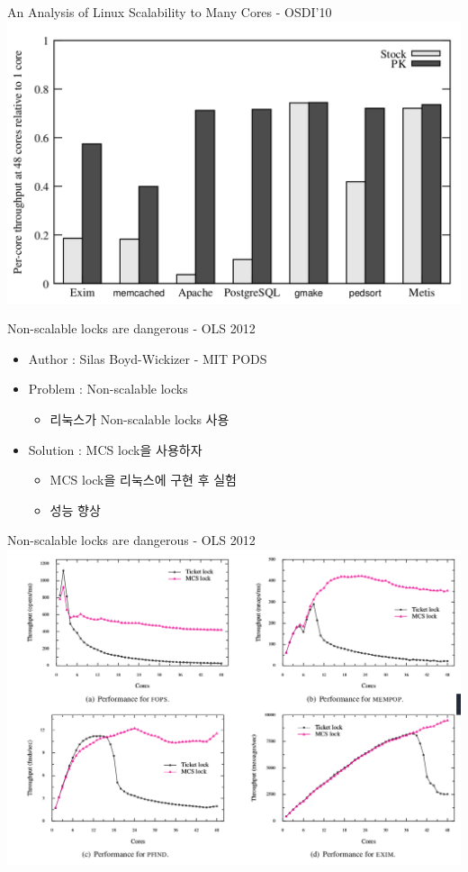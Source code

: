 \documentclass[english]{beamer} %
\begin{document}
\begin{frame}{An Analysis of Linux Scalability to Many Cores - OSDI'10 }
\includegraphics[width=\textwidth,height=0.6\textheight,
keepaspectratio]{scalability}
\end{frame}

\begin{frame}{Non-scalable locks are dangerous - OLS 2012 }
    \begin{itemize}
    \item Author :  Silas Boyd-Wickizer - MIT PODS
    \item Problem : Non-scalable locks 
        \begin{itemize}
        \item 리눅스가 Non-scalable locks 사용
        \end{itemize}
    \item Solution : MCS lock을 사용하자
        \begin{itemize}
        \item MCS lock을 리눅스에 구현 후 실험
        \item 성능 향상
        \end{itemize}
    \end{itemize}
\end{frame}

\begin{frame}{Non-scalable locks are dangerous - OLS 2012 }
\includegraphics[width=\textwidth,height=0.8\textheight,
keepaspectratio]{mcs}
\end{frame}
\end{document}
